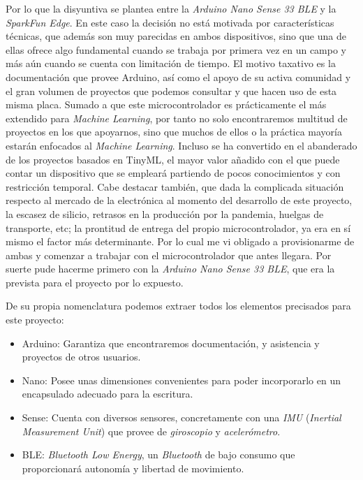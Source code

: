 Por lo que la disyuntiva se plantea entre la \textit{Arduino Nano Sense 33 BLE}
y la \textit{SparkFun Edge}.
En este caso la decisión no está motivada por características técnicas, que
además son muy parecidas en ambos dispositivos, sino que una de ellas ofrece
algo fundamental cuando se trabaja por primera vez en un campo y más aún
cuando se cuenta con limitación de tiempo.
El motivo taxativo es la documentación que provee Arduino, así como el apoyo
de su activa comunidad y el gran volumen de proyectos que podemos consultar y
que hacen uso de esta misma placa. Sumado a que este microcontrolador es
prácticamente el más extendido para \textit{Machine Learning}, por tanto
no solo encontraremos multitud de proyectos en los que apoyarnos, sino que
muchos de ellos o la práctica mayoría estarán enfocados al \textit{Machine
Learning}. Incluso se ha convertido en el abanderado de los proyectos basados
en TinyML, el mayor valor añadido con el que puede contar un dispositivo
que se empleará partiendo de pocos conocimientos y con restricción temporal.
Cabe destacar también, que dada la complicada situación respecto al mercado
de la electrónica al momento del desarrollo de este proyecto, la escasez de
silicio, retrasos en la producción por la
pandemia, huelgas de transporte, etc; la prontitud de entrega del propio
microcontrolador, ya era en sí mismo el factor más determinante. Por lo cual
me vi obligado a provisionarme de ambas y comenzar a trabajar con el
microcontrolador que antes llegara. Por suerte pude hacerme primero con
la \textit{Arduino Nano Sense 33 BLE}, que era la prevista para el proyecto por lo expuesto.


De su propia nomenclatura podemos extraer todos los elementos precisados para
este proyecto:
\begin{itemize}
    \itemsep0em 
    \item Arduino: Garantiza que encontraremos documentación, y asistencia
    y proyectos de otros usuarios.
    \item Nano: Posee unas dimensiones convenientes para poder incorporarlo
    en un encapsulado adecuado para la escritura.
    \item Sense: Cuenta con diversos sensores, concretamente con una \textit{IMU}
    (\textit{Inertial Measurement Unit})
    que provee de \textit{giroscopio} y \textit{acelerómetro}.
    \item BLE: \textit{Bluetooth Low Energy}, un \textit{Bluetooth} de bajo
    consumo que proporcionará autonomía y libertad de movimiento.
\end{itemize}

